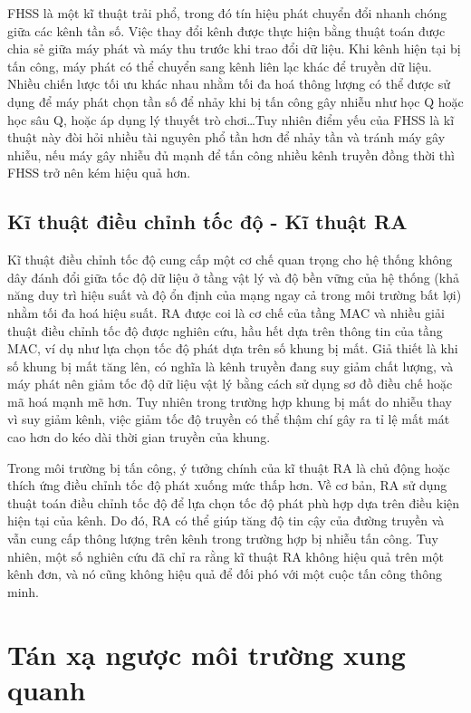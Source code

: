 \documentclass{uetgraduation}
\begin{document}
FHSS là một kĩ thuật trải phổ, trong đó tín hiệu phát chuyển đổi nhanh chóng giữa các kênh tần số. Việc thay đổi kênh được thực hiện bằng thuật toán được chia sẻ giữa
máy phát và máy thu trước khi trao đổi dữ liệu. Khi kênh hiện tại bị tấn công, máy phát có thể chuyển sang kênh liên lạc khác để truyền dữ liệu. Nhiều chiến lược tối
ưu khác nhau nhằm tối đa hoá thông lượng có thể được sử dụng để máy phát chọn tần số để nhảy khi bị tấn công gây nhiễu như học Q hoặc học sâu Q, hoặc áp dụng lý thuyết
trò chơi\dots Tuy nhiên điểm yếu của FHSS là kĩ thuật này đòi hỏi nhiều tài nguyên phổ tần hơn để nhảy tần và tránh máy gây nhiễu, nếu máy gây nhiễu đủ mạnh để tấn công
nhiều kênh truyền đồng thời thì FHSS trở nên kém hiệu quả hơn.

\subsection{Kĩ thuật điều chỉnh tốc độ - Kĩ thuật RA}
Kĩ thuật điều chỉnh tốc độ cung cấp một cơ chế quan trọng cho hệ thống không dây đánh đổi giữa tốc độ dữ liệu ở tầng vật lý và độ bền vững của hệ thống (khả năng duy
trì hiệu suất và độ ổn định của mạng ngay cả trong môi trường bất lợi) nhằm tối đa hoá hiệu suất. RA được coi là cơ chế của tầng MAC và nhiều giải thuật điều chỉnh
tốc độ được nghiên cứu, hầu hết dựa trên thông tin của tầng MAC, ví dụ như lựa chọn tốc độ phát dựa trên số khung bị mất. Giả thiết là khi số khung bị mất tăng lên,
có nghĩa là kênh truyền đang suy giảm chất lượng, và máy phát nên giảm tốc độ dữ liệu vật lý bằng cách sử dụng sơ đồ điều chế hoặc mã hoá mạnh mẽ hơn. Tuy nhiên trong
trường hợp khung bị mất do nhiễu thay vì suy giảm kênh, việc giảm tốc độ truyền có thể thậm chí gây ra tỉ lệ mất mát cao hơn do kéo dài thời gian truyền của khung.

Trong môi trường bị tấn công, ý tưởng chính của kĩ thuật RA là chủ động hoặc thích ứng điều chỉnh tốc độ phát xuống mức thấp hơn. Về cơ bản, RA sử dụng thuật toán điều 
chỉnh tốc độ để lựa chọn tốc độ phát phù hợp dựa trên điều kiện hiện tại của kênh. Do đó, RA có thể giúp tăng độ tin cậy của đường truyền và vẫn cung cấp thông lượng 
trên kênh trong trường hợp bị nhiễu tấn công. Tuy nhiên, một số nghiên cứu đã chỉ ra rằng kĩ thuật RA không hiệu quả trên một kênh đơn, và nó cũng không hiệu
quả để đối phó với một cuộc tấn công thông minh.

\section{Tán xạ ngược môi trường xung quanh}
\end{document}
